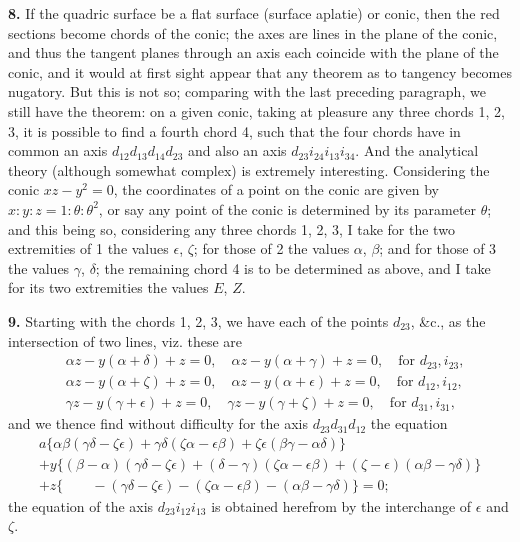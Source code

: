 \documentclass[12pt,a4paper]{article}
\begin{document}
\textbf{8.} If the quadric surface be a flat surface (surface aplatie) or conic, then the red sections become chords of the conic; the axes are lines in the plane of the conic, and thus the tangent planes through an axis each coincide with the plane of the conic, and it would at first sight appear that any theorem as to tangency becomes nugatory. But this is not so; comparing with the last preceding paragraph, we still have the theorem: on a given conic, taking at pleasure any three chords 1, 2, 3, it is possible to find a fourth chord 4, such that the four chords have in common an axis $d_{12}d_{13}d_{14}d_{23}$ and also an axis $d_{23}i_{24}i_{13}i_{34}$. And the analytical theory (although somewhat complex) is extremely interesting. Considering the conic $xz-y^{2}=0$, the coordinates of a point on the conic are given by $x:y:z = 1:\theta:\theta^{2}$, or say any point of the conic is determined by its parameter $\theta$; and this being so, considering any three chords 1, 2, 3, I take for the two extremities of 1 the values $\epsilon$, $\zeta$; for those of 2 the values $\alpha$, $\beta$; and for those of 3 the values $\gamma$, $\delta$; the remaining chord 4 is to be determined as above, and I take for its two extremities the values $E$, $Z$.

\textbf{9.} Starting with the chords 1, 2, 3, we have each of the points $d_{23}$, \&c., as the intersection of two lines, viz. these are
\[
\begin{aligned}
&\alpha z - y(\alpha+\delta) + z = 0, \quad \alpha z - y(\alpha+\gamma) + z = 0, \quad \text{for } d_{23}, i_{23},\\
&\alpha z - y(\alpha+\zeta) + z = 0, \quad \alpha z - y(\alpha+\epsilon) + z = 0, \quad \text{for } d_{12}, i_{12},\\
&\gamma z - y(\gamma+\epsilon) + z = 0, \quad \gamma z - y(\gamma+\zeta) + z = 0, \quad \text{for } d_{31}, i_{31},
\end{aligned}
\]
and we thence find without difficulty for the axis $d_{23}d_{31}d_{12}$ the equation
\begin{multline*}
a\{\alpha\beta(\gamma\delta - \zeta\epsilon) + \gamma\delta(\zeta\alpha - \epsilon\beta) + \zeta\epsilon(\beta\gamma - \alpha\delta)\} \\
+ y\{(\beta-\alpha)(\gamma\delta - \zeta\epsilon) + (\delta-\gamma)(\zeta\alpha - \epsilon\beta) + (\zeta-\epsilon)(\alpha\beta - \gamma\delta)\} \\
+ z\{\quad\quad - (\gamma\delta - \zeta\epsilon) - (\zeta\alpha - \epsilon\beta) - (\alpha\beta - \gamma\delta)\} = 0;
\end{multline*}
the equation of the axis $d_{23}i_{12}i_{13}$ is obtained herefrom by the interchange of $\epsilon$ and $\zeta$.
\end{document}
